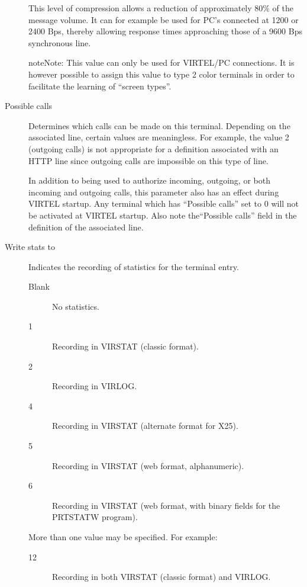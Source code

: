 \documentclass[letterpaper,10pt,english]{sphinxmanual}
\begin{document}
\begin{description}
This level of compression allows a reduction of approximately 80\% of the message volume. It can for example be used for PC’s connected at 1200 or 2400 Bps, thereby allowing response times approaching those of a 9600 Bps synchronous line.

\begin{sphinxadmonition}{note}{Note:}
This value can only be used for VIRTEL/PC connections. It is however possible to assign this value to type 2 color terminals in order to facilitate the learning of “screen types”.
\end{sphinxadmonition}

\item[{Possible calls}] \leavevmode
Determines which calls can be made on this terminal. Depending on the associated line, certain values are meaningless. For example, the value 2 (outgoing calls) is not appropriate for a definition associated with an HTTP line since outgoing calls are impossible on this type of line.

In addition to being used to authorize incoming, outgoing, or both incoming and outgoing calls, this parameter also has an effect during VIRTEL startup. Any terminal which has “Possible calls” set to 0 will not be activated at VIRTEL startup. Also note the“Possible calls” field in the definition of the associated line.

\item[{Write stats to}] \leavevmode
Indicates the recording of statistics for the terminal entry.
\begin{description}
\item[{Blank}] \leavevmode
No statistics.

\item[{1}] \leavevmode
Recording in VIRSTAT (classic format).

\item[{2}] \leavevmode
Recording in VIRLOG.

\item[{4}] \leavevmode
Recording in VIRSTAT (alternate format for X25).

\item[{5}] \leavevmode
Recording in VIRSTAT (web format, alphanumeric).

\item[{6}] \leavevmode
Recording in VIRSTAT (web format, with binary fields for the PRTSTATW program).

\end{description}

More than one value may be specified. For example:
\begin{description}
\item[{12}] \leavevmode
Recording in both VIRSTAT (classic format) and VIRLOG.


\end{description}
\end{description}
\end{document}
